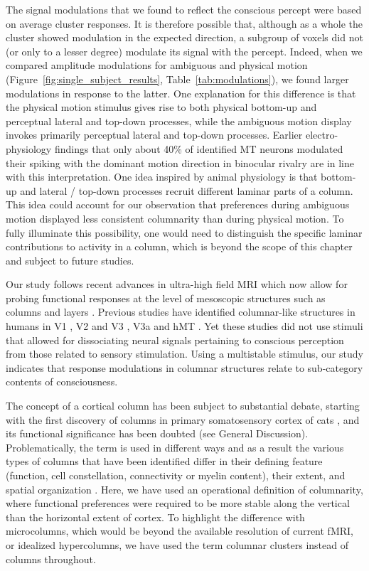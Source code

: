 The signal modulations that we found to reflect the conscious percept were based on average cluster responses. It is therefore possible that, although as a whole the cluster showed modulation in the expected direction, a subgroup of voxels did not (or only to a lesser degree) modulate its signal with the percept. Indeed, when we compared amplitude modulations for ambiguous and physical motion (Figure~\ref{fig:single_subject_results}, Table~\ref{tab:modulations}), we found larger modulations in response to the latter. One explanation for this difference is that the physical motion stimulus gives rise to both physical bottom-up and perceptual lateral and top-down processes, while the ambiguous motion display invokes primarily perceptual lateral and top-down processes. Earlier electro-physiology findings that only about 40\% of identified MT neurons modulated their spiking with the dominant motion direction in binocular rivalry \parencite{Logothetis1989} are in line with this interpretation. One idea inspired by animal physiology \parencite{Felleman1991, Markov2014} is that bottom-up and lateral / top-down processes recruit different laminar parts of a column. This idea could account for our observation that preferences during ambiguous motion displayed less consistent columnarity than during physical motion. To fully illuminate this possibility, one would need to distinguish the specific laminar contributions to activity in a column, which is beyond the scope of this chapter and subject to future studies.

Our study follows recent advances in ultra-high field MRI which now allow for probing functional responses at the level of mesoscopic structures such as columns and layers \parencite{Polimeni2017, DeMartino2016, Kemper2017}. Previous studies have identified columnar-like structures in humans in V1 \parencite{Cheng2001, Yacoub2008}, V2 and V3 \parencite{Nasr2016}, V3a \parencite{Goncalves2015} and hMT \parencite{Zimmermann2011}. Yet these studies did not use stimuli that allowed for dissociating neural signals pertaining to conscious perception from those related to sensory stimulation. Using a multistable stimulus, our study indicates that response modulations in columnar structures relate to sub-category contents of consciousness.

The concept of a cortical column has been subject to substantial debate, starting with the first discovery of columns in primary somatosensory cortex of cats \parencite{Mountcastle1956}, and its functional significance has been doubted (see General Discussion). Problematically, the term is used in different ways and as a result the various types of columns that have been identified differ in their defining feature (function, cell constellation, connectivity or myelin content), their extent, and spatial organization \parencite{Rakic2008}. Here, we have used an operational definition of columnarity, where functional preferences were required to be more stable along the vertical than the horizontal extent of cortex. To highlight the difference with microcolumns, which would be beyond the available resolution of current fMRI, or idealized hypercolumns, we have used the term columnar clusters instead of columns throughout.


